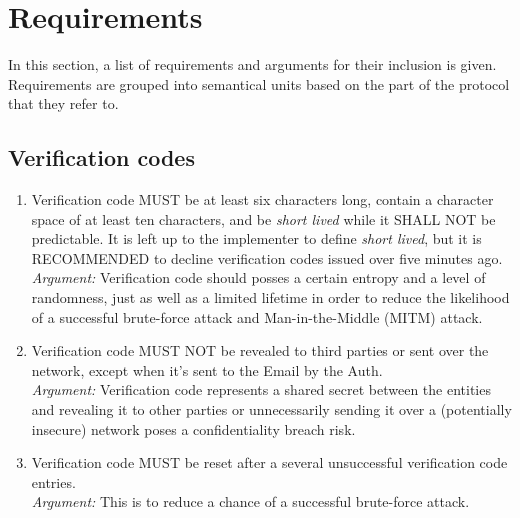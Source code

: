 \section{Requirements}
In this section, a list of requirements and arguments for their inclusion is given. Requirements are grouped into 
semantical units based on the part of the protocol that they refer to.

    \subsection{Verification codes}
        \begin{enumerate}
            \item Verification code MUST be at least six characters long, contain a character space of at 
                  least ten characters, and be \textit{short lived} while it SHALL NOT be predictable. It is 
                  left up to the implementer to define \textit{short lived}, but it is RECOMMENDED to decline 
                  verification codes issued over five minutes ago.\\    
            \textit{Argument:} Verification code should posses a certain entropy and a level of randomness, 
                               just as well as a limited lifetime in order to reduce  the likelihood of a 
                               successful brute-force attack and Man-in-the-Middle (MITM) attack.

            \item Verification code MUST NOT be revealed to third parties or sent over the network, 
                  except when it's sent to the Email by the Auth.\\        
            \textit{Argument:} Verification code represents a shared secret between the entities and revealing 
                               it to other parties or unnecessarily sending it over a (potentially insecure) 
                               network poses a confidentiality breach risk.

            \item Verification code MUST be reset after a several unsuccessful verification code entries.\\        
            \textit{Argument:} This is to reduce a chance of a successful brute-force attack.
        \end{enumerate}


